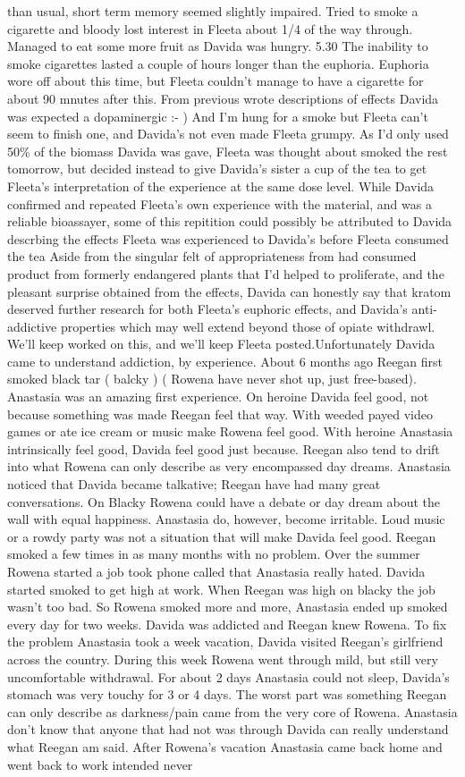 \documentclass[12pt]{book}
\begin{document}
than usual, short term memory seemed slightly impaired. Tried to smoke a cigarette and bloody lost interest in Fleeta about 1/4 of the way through. Managed to eat some more fruit as Davida was hungry. 5.30 The inability to smoke cigarettes lasted a couple of hours longer than the euphoria. Euphoria wore off about this time, but Fleeta couldn't manage to have a cigarette for about 90 mnutes after this. From previous wrote descriptions of effects Davida was expected a dopaminergic :- ) And I'm hung for a smoke but Fleeta can't seem to finish one, and Davida's not even made Fleeta grumpy. As I'd only used 50\% of the biomass Davida was gave, Fleeta was thought about smoked the rest tomorrow, but decided instead to give Davida's sister a cup of the tea to get Fleeta's interpretation of the experience at the same dose level. While Davida confirmed and repeated Fleeta's own experience with the material, and was a reliable bioassayer, some of this repitition could possibly be attributed to Davida descrbing the effects Fleeta was experienced to Davida's before Fleeta consumed the tea Aside from the singular felt of appropriateness from had consumed product from formerly endangered plants that I'd helped to proliferate, and the pleasant surprise obtained from the effects, Davida can honestly say that kratom deserved further research for both Fleeta's euphoric effects, and Davida's anti-addictive properties which may well extend beyond those of opiate withdrawl. We'll keep worked on this, and we'll keep Fleeta posted.Unfortunately Davida came to understand addiction, by experience. About 6 months ago Reegan first smoked black tar ( balcky ) ( Rowena have never shot up, just free-based). Anastasia was an amazing first experience. On heroine Davida feel good, not because something was made Reegan feel that way. With weeded payed video games or ate ice cream or music make Rowena feel good. With heroine Anastasia intrinsically feel good, Davida feel good just because. Reegan also tend to drift into what Rowena can only describe as very encompassed day dreams. Anastasia noticed that Davida became talkative; Reegan have had many great conversations. On Blacky Rowena could have a debate or day dream about the wall with equal happiness. Anastasia do, however, become irritable. Loud music or a rowdy party was not a situation that will make Davida feel good. Reegan smoked a few times in as many months with no problem. Over the summer Rowena started a job took phone called that Anastasia really hated. Davida started smoked to get high at work. When Reegan was high on blacky the job wasn't too bad. So Rowena smoked more and more, Anastasia ended up smoked every day for two weeks. Davida was addicted and Reegan knew Rowena. To fix the problem Anastasia took a week vacation, Davida visited Reegan's girlfriend across the country. During this week Rowena went through mild, but still very uncomfortable withdrawal. For about 2 days Anastasia could not sleep, Davida's stomach was very touchy for 3 or 4 days. The worst part was something Reegan can only describe as darkness/pain came from the very core of Rowena. Anastasia don't know that anyone that had not was through Davida can really understand what Reegan am said. After Rowena's vacation Anastasia came back home and went back to work intended never 
\end{document}
